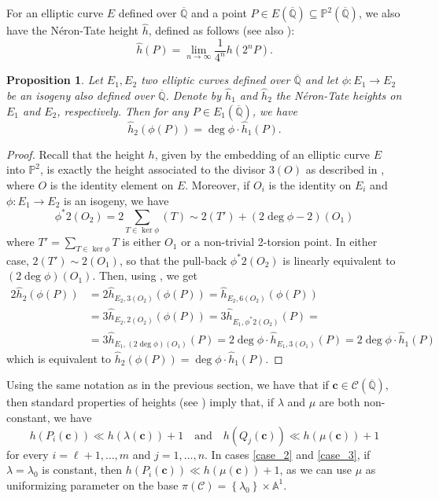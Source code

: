\documentclass[11pt,a4paper,reqno]{amsart}
\numberwithin{equation}{section}
\newcommand{\A}{\mathbb{A}}
\renewcommand{\P}{\mathbb{P}}
\newcommand{\Qal}{\overline{\mathbb{Q}}}
\renewcommand{\c}{\mathcal{C}}
\newcommand{\cc}{\mathbf{c}}
\renewcommand{\l}{\lambda}
\newcommand{\m}{\mu}
\newcommand{\pt}[1]{\left( #1 \right)}
\newcommand{\pg}[1]{\left\lbrace #1 \right\rbrace}
\newtheorem{proposition}[theorem]{Proposition}
\theoremstyle{remark}
\theoremstyle{definition}
\theoremstyle{definition}
\begin{document}
For an elliptic curve $E$ defined over $\Qal$ and a point $P \in E(\Qal)\subseteq \P^2(\Qal)$, we also have the Néron-Tate height $\widehat{h}$, defined as follows (see also \cite[VII.9]{Sil09}):
$$\widehat{h}(P)=\lim\limits_{n\rightarrow\infty}\dfrac{1}{4^n}h(2^nP).$$
\begin{proposition}\label{PropHIso}
Let $E_1,E_2$ two elliptic curves defined over $\Qal$ and let $\phi: E_1 \rightarrow E_2$ be an isogeny also defined over $\Qal$. Denote by $\widehat{h}_1$ and $\widehat{h}_2$ the Néron-Tate heights on $E_1$ and $E_2$, respectively. Then for any $P \in E_1(\Qal)$, we have
$$\widehat{h}_2(\phi(P))=\deg \phi \cdot \widehat{h}_1(P).$$
\end{proposition}
\begin{proof}
Recall that the height $h$, given by the embedding of an elliptic curve $E$ into $\P^2$, is exactly the height associated to the divisor $3(O)$ as described in \cite[Section B.3]{HS13}, where $O$ is the identity element on $E$. Moreover, if $O_i$ is the identity on $E_i$ and $\phi : E_1 \rightarrow E_2$ is an isogeny, we have 
$$\phi^* 2(O_2)=2\sum\limits_{T \in \ker \phi}(T)\sim 2(T')+(2\deg\phi-2)(O_1)$$
where $T'=\sum\limits_{T \in \ker \phi}T$ is either $O_1$ or a non-trivial 2-torsion point. In either case, $2(T')\sim 2(O_1)$, so that the pull-back $\phi^* 2(O_2)$ is linearly equivalent to $(2\deg \phi)(O_1)$.
Then, using \cite[Theorem B.5.6]{HS13}, we get
\begin{align*}
2 \widehat{h}_2(\phi(P))&=2 \widehat{h}_{E_2, 3(O_2)}(\phi(P))= \widehat{h}_{E_2, 6(O_2)}(\phi(P))\\
	&= 3 \widehat{h}_{E_2, 2(O_2)}(\phi(P))= 3 \widehat{h}_{E_1, \phi^* 2(O_2)}(P)=\\
	&=3 \widehat{h}_{E_1, (2\deg\phi)(O_1)}(P) = 2 \deg \phi \cdot \widehat{h}_{E_1, 3(O_1)}(P) = 2 \deg \phi \cdot \widehat{h}_1(P)
\end{align*}
which is equivalent to $\widehat{h}_2(\phi(P))=\deg \phi \cdot \widehat{h}_1(P)$.
\end{proof}
Using the same notation as in the previous section, we have that if $\cc \in \c\pt{\Qal}$, then standard properties of heights (see \cite[Theorem B.2.5]{HS13}) imply that, if $\l$ and $\m$ are both non-constant, we have 
\begin{equation}\label{eqn:height_bounds_P_lambda}
h(P_i(\cc))\ll h(\l(\cc))+1 \quad \textrm{and} \quad  h(Q_j(\cc))\ll h(\m(\cc))+1
\end{equation}
for every $i=\ell+1,\ldots,m$ and $j=1, \ldots, n$. In cases \ref{case_2} and \ref{case_3}, if $\l=\l_0$ is constant, then $h(P_i(\cc))\ll h(\m(\cc))+1$, as we can use $\m$ as uniformizing parameter on the base $\pi(\c)=\pg{\l_0} \times \A^1$.
\end{document}
